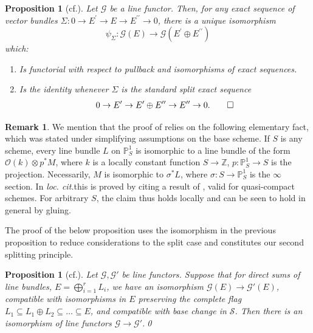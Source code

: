 \documentclass[11pt]{article}
\providecommand{\loccit}{\emph{loc. cit.}}
\newcommand{\cf}{cf.\xspace}
\theoremstyle{plain}
\newtheorem{proposition}[theorem]{Proposition}
\theoremstyle{definition}
\newtheorem{remark}[theorem]{Remark}
\newcommand{\PBbb}{\mathbb P}
\newcommand{\ZBbb}{\mathbb Z}
\newcommand{\Gcal}{\mathcal G}
\newcommand{\Ocal}{\mathcal O}
\newcommand{\Scal}{\mathcal S}
\newcommand{\bis}{\prime\prime}
\begin{document}
\begin{proposition}[{\cf \cite[Prop.\,2.2]{Eriksson-Freixas-Wentworth}}]\label{prop:split} Let $\Gcal$ be a line functor. Then, for any exact sequence of vector bundles $\Sigma: 0 \to E^{\prime} \to E \to E^{\bis} \to 0$, there is a unique isomorphism\vspace*{-3pt}\enlargethispage{.5\baselineskip}%
\begin{displaymath}
\psi_\Sigma\colon \Gcal(E) \to \Gcal(E^{\prime} \oplus E^{\bis})
\end{displaymath}
which:
\begin{enumerate}
\item Is functorial with respect to pullback and isomorphisms of exact sequences.
\item Is the identity whenever $\Sigma$ is the standard split exact sequence\vspace*{-3pt}
\begin{multline}\label{eq:standardsplit}
\mbox{}\hfill 0 \to E^{\prime} \to E^{\prime} \oplus E^{\bis} \to E^{\bis} \to 0.\hfill\mbox{}\qed
\end{multline}
\end{enumerate}
\end{proposition}

\begin{remark} \label{rem:linebundlesonprojective}
We mention that the proof of \cite[Prop.\,2.2]{Eriksson-Freixas-Wentworth} relies on the following elementary fact, which was stated under simplifying assumptions on the base scheme. If $S$ is any scheme, every line bundle $L$ on $\PBbb^{1}_{S}$ is isomorphic to a line bundle of the form $\Ocal(k)\otimes p^{\ast}M$, where $k$ is a locally constant function $S\to\ZBbb$, $p\colon\PBbb^{1}_{S}\to S $ is the projection. Necessarily, $M$ is isomorphic to $\sigma^{\ast}L$, where $\sigma\colon S\to\PBbb^{1}_{S}$ is the $\infty$ section. In \loccit this is proved by citing a result of \cite{Quillen:K-theory-I}, valid for quasi-compact schemes. For arbitrary $S$, the claim thus holds locally and can be seen to hold in general by gluing.
\end{remark}

The proof of the below proposition uses the isomorphism in the previous proposition to reduce considerations to the split case and constitutes our second splitting principle.

\begin{proposition}[{\cf \cite[Th.\,2.10 \& Rem.\,2.12]{Eriksson-Freixas-Wentworth}}] \label{Prop:2ndsplitting}Let $\Gcal, \Gcal'$ be line functors. Suppose that for direct sums of line bundles, $E = \bigoplus_{i=1}^{r} L_i$, we have an isomorphism $\Gcal(E) \to \Gcal'(E)$, compatible with isomorphisms in $E$ preserving the complete flag \hbox{$L_1 \subseteq L_1 \oplus L_2 \subseteq \ldots \subseteq E$}, and compatible with base change in $\Scal$. Then there is an isomorphism of line functors $\Gcal \to \Gcal'$.\qed
\end{proposition}
\end{document}
